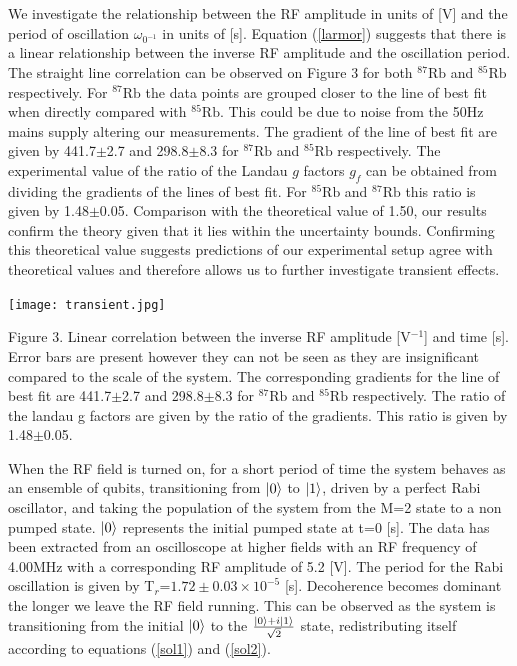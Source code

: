 \documentclass{article}
\DeclarePairedDelimiter\ket{\lvert}{\rangle}
\begin{document}
\begin{multicols*}{2}
We investigate the relationship between the RF amplitude in units of [V] and the period of oscillation $\omega _{0^{-1}}$ in units of [s]. Equation (\ref{larmor}) suggests that there is a linear relationship between the inverse RF amplitude and the oscillation period. The straight line correlation can be observed on Figure 3 for both $^{87}\mathrm{Rb}$
and $^{85}\mathrm{Rb}$ respectively. For $^{87}\mathrm{Rb}$ the data points are grouped closer to the line of best fit when directly compared with $^{85}\mathrm{Rb}$. This could be due to noise from the 50Hz mains supply altering our measurements. The gradient of the line of best fit are given by 441.7$\pm$2.7 and 298.8$\pm$8.3 for $^{87}\mathrm{Rb}$ and $^{85}\mathrm{Rb}$  respectively. The experimental value of the ratio of the Landau $g$ factors $g_f$ can be obtained from dividing the gradients of the lines of best fit. For $^{85}\mathrm{Rb}$ and $^{87}\mathrm{Rb}$ this ratio is given by 1.48$\pm$0.05. Comparison with the theoretical value of 1.50, our results confirm the theory given that it lies within the uncertainty bounds. Confirming this theoretical value suggests predictions of our experimental setup agree with theoretical values and therefore allows us to further investigate transient effects.
\\

\newline
\begin{Figure}
\centering
\texttt{[image: transient.jpg]}

\footnotesize
    Figure 3. Linear correlation between the inverse RF amplitude [V$^{-1}$] and time [s]. Error bars are present however they can not be seen as they are insignificant compared to the scale of the system. The corresponding gradients for the line of best fit are 441.7$\pm$2.7 and 298.8$\pm$8.3 for $^{87}\mathrm{Rb}$ and $^{85}\mathrm{Rb}$ respectively. The ratio of the landau g factors are given by the ratio of the gradients. This ratio is given by  1.48$\pm$0.05.
\normalsize
\end{Figure}
\newline

When the RF field is turned on, for a short period of time the system behaves as an ensemble of qubits, transitioning from $\ket{0}$ to $\ket{1}$, driven by a perfect Rabi oscillator, and taking the population of the system from the M=2 state to a non pumped state. $\ket{0}$ represents the initial pumped state at t=0 [s]. The data has been extracted from an oscilloscope at higher fields with an RF frequency of 4.00MHz with a corresponding RF amplitude of 5.2 [V]. The period for the Rabi oscillation is given by T$_r$=$1.72\pm0.03\times10^{-5}$ [s]. Decoherence becomes dominant the longer we leave the RF field running. This can be observed as the system is transitioning from the initial $\ket{0}$ to the $\frac{\ket{0}+i\ket{1}}{\sqrt{2}}$ state, redistributing itself according to equations (\ref{sol1}) and (\ref{sol2}). 


\end{multicols*}
\end{document}
